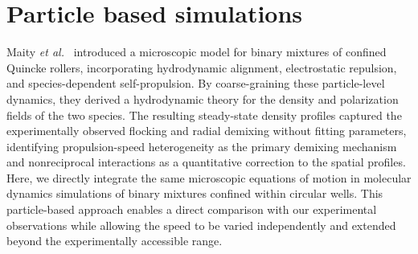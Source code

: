 \documentclass[aps,pre,twocolumn,amsmath,amssymb,notitlepage,superscriptaddress,longbibliography,nofootinbib,10pt]{revtex4-1}
\begin{document}


\section{Particle based simulations}
\label{sec:simulations}
Maity \textit{et al.}~\cite{PhysRevLett.131.178304} introduced a microscopic model for binary mixtures of confined Quincke rollers, incorporating hydrodynamic alignment, electrostatic repulsion, and species-dependent self-propulsion. By coarse-graining these particle-level dynamics, they derived a hydrodynamic theory for the density and polarization fields of the two species. The resulting steady-state density profiles captured the experimentally observed flocking and radial demixing without fitting parameters, identifying propulsion-speed heterogeneity as the primary demixing mechanism and nonreciprocal interactions as a quantitative correction to the spatial profiles.
Here, we directly integrate the same microscopic equations of motion in molecular dynamics simulations of binary mixtures confined within circular wells. This particle-based approach enables a direct comparison with our experimental observations while allowing the speed to be varied independently and extended beyond the experimentally accessible range.
\end{document}
